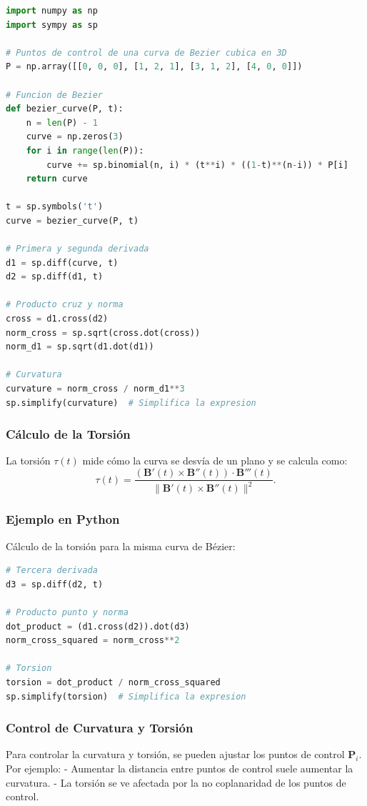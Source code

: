 \documentclass[11pt]{book}
\theoremstyle{definicion}
\theoremstyle{teorema}
\theoremstyle{ejemplo}
\begin{document}
\begin{lstlisting}[language=Python, caption=Cálculo de la curvatura en Python]
import numpy as np
import sympy as sp

# Puntos de control de una curva de Bezier cubica en 3D
P = np.array([[0, 0, 0], [1, 2, 1], [3, 1, 2], [4, 0, 0]])

# Funcion de Bezier
def bezier_curve(P, t):
    n = len(P) - 1
    curve = np.zeros(3)
    for i in range(len(P)):
        curve += sp.binomial(n, i) * (t**i) * ((1-t)**(n-i)) * P[i]
    return curve

t = sp.symbols('t')
curve = bezier_curve(P, t)

# Primera y segunda derivada
d1 = sp.diff(curve, t)
d2 = sp.diff(d1, t)

# Producto cruz y norma
cross = d1.cross(d2)
norm_cross = sp.sqrt(cross.dot(cross))
norm_d1 = sp.sqrt(d1.dot(d1))

# Curvatura
curvature = norm_cross / norm_d1**3
sp.simplify(curvature)  # Simplifica la expresion
\end{lstlisting}

\subsubsection{Cálculo de la Torsión}
\noindent La {torsión} \( \tau(t) \) mide cómo la curva se desvía de un plano y se calcula como:
\[
\tau(t) = \frac{(\mathbf{B}'(t) \times \mathbf{B}''(t)) \cdot \mathbf{B}'''(t)}{\|\mathbf{B}'(t) \times \mathbf{B}''(t)\|^2}.
\]

\subsubsection{Ejemplo en Python}
\noindent Cálculo de la torsión para la misma curva de Bézier:

\begin{lstlisting}[language=Python, caption=Cálculo de la torsión en Python]
# Tercera derivada
d3 = sp.diff(d2, t)

# Producto punto y norma
dot_product = (d1.cross(d2)).dot(d3)
norm_cross_squared = norm_cross**2

# Torsion
torsion = dot_product / norm_cross_squared
sp.simplify(torsion)  # Simplifica la expresion
\end{lstlisting}

\subsubsection{Control de Curvatura y Torsión}
\noindent Para {controlar} la curvatura y torsión, se pueden ajustar los puntos de control \( \mathbf{P}_i \). Por ejemplo:
- Aumentar la distancia entre puntos de control suele aumentar la curvatura.
- La torsión se ve afectada por la no coplanaridad de los puntos de control.
\end{document}
